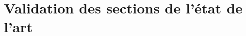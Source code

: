 \documentclass[11pt,a4paper]{report}
\begin{document}
\chapter{Validation des sections de l'état de l'art}










\end{document}
